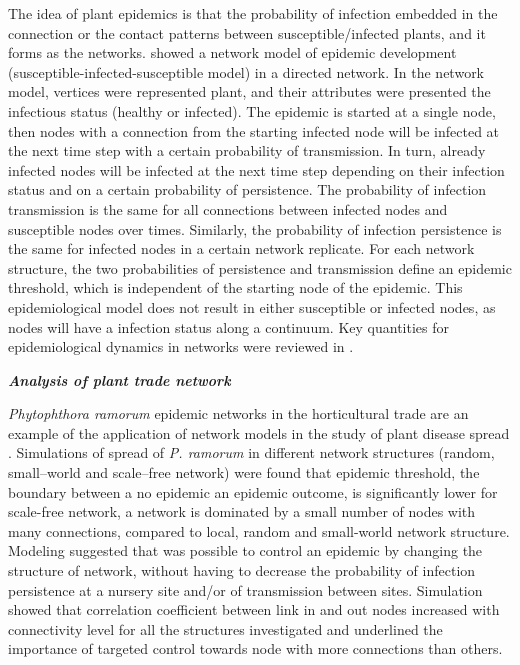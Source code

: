 The idea of plant epidemics is that the probability of infection embedded in the connection or the contact patterns between susceptible/infected plants, and it forms as the networks. \citet{pautasso2010number} showed a network model of epidemic development (susceptible-infected-susceptible model) in a directed network. In the network model, vertices were represented plant, and their attributes were presented the infectious status (healthy or infected). The epidemic is started at a single node, then nodes with a connection from the starting infected node will be infected at the next time step with a certain probability of transmission. In turn, already infected nodes will be infected at the next time step depending on their infection status and on a certain probability of persistence. The probability of infection transmission is the same for all connections between infected nodes and susceptible nodes over times. Similarly, the probability of infection persistence is the same for infected nodes in a certain network replicate. For each network structure, the two probabilities of persistence and transmission define an epidemic threshold, which is independent of the starting node of the epidemic. This epidemiological model does not result in either susceptible or infected nodes, as nodes will have a infection status along a continuum. Key quantities for epidemiological dynamics in networks were reviewed in \citet{Lefebvre:2011fo}.

\textit{\textbf{Analysis of plant trade network}}

\textit{Phytophthora ramorum} epidemic networks in the horticultural trade are an example of the application of network models in the study of plant disease spread \citep{harwood2009epidemiological,Moslonka2010}. Simulations of spread of \textit{P. ramorum} in different network structures (random, small--world and scale--free network) were found that epidemic threshold, the boundary between a no epidemic an epidemic outcome, is significantly lower for scale-free network, a network is dominated by a small number of nodes with many connections, compared to local, random and small-world network structure. Modeling suggested that was possible to control an epidemic by changing the structure of network, without having to decrease the probability of infection persistence at a nursery site and/or of transmission between sites. Simulation showed that correlation coefficient between link in and out nodes increased with connectivity level for all the structures investigated and underlined the importance of targeted control towards node with more connections than others. 

